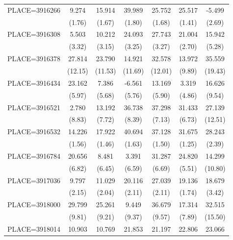 {\begin{tabular}{l*{6}{c}}
PLACE=3916266       &       9.274&      15.914&      39.989&      25.752&      25.517&      -5.499\\
                    &      (1.76)&      (1.67)&      (1.80)&      (1.68)&      (1.41)&      (2.69)\\
PLACE=3916308       &       5.503&      10.212&      24.093&      27.743&      21.004&      15.942\\
                    &      (3.32)&      (3.15)&      (3.25)&      (3.27)&      (2.70)&      (5.28)\\
PLACE=3916378       &      27.814&      23.790&      14.921&      32.578&      13.972&      35.559\\
                    &     (12.15)&     (11.53)&     (11.69)&     (12.01)&      (9.89)&     (19.43)\\
PLACE=3916434       &      23.162&       7.386&      -6.561&      13.169&       3.319&      16.626\\
                    &      (5.97)&      (5.68)&      (5.76)&      (5.90)&      (4.86)&      (9.54)\\
PLACE=3916521       &       2.780&      13.192&      36.738&      37.298&      31.433&      27.139\\
                    &      (8.83)&      (7.72)&      (8.39)&      (7.13)&      (6.73)&     (12.51)\\
PLACE=3916532       &      14.226&      17.922&      40.694&      37.128&      31.675&      28.243\\
                    &      (1.56)&      (1.46)&      (1.63)&      (1.50)&      (1.25)&      (2.39)\\
PLACE=3916784       &      20.656&       8.481&       3.391&      31.287&      24.820&      14.299\\
                    &      (6.82)&      (6.45)&      (6.59)&      (6.69)&      (5.51)&     (10.80)\\
PLACE=3917036       &       9.797&      11.029&      20.116&      27.039&      19.136&      18.679\\
                    &      (2.15)&      (2.04)&      (2.11)&      (2.11)&      (1.74)&      (3.42)\\
PLACE=3918000       &      29.799&      25.261&       9.449&      36.679&      17.314&      32.515\\
                    &      (9.81)&      (9.21)&      (9.37)&      (9.57)&      (7.89)&     (15.50)\\
PLACE=3918014       &      10.903&      10.769&      21.853&      21.197&      22.806&      23.066\\

\end{tabular}}
